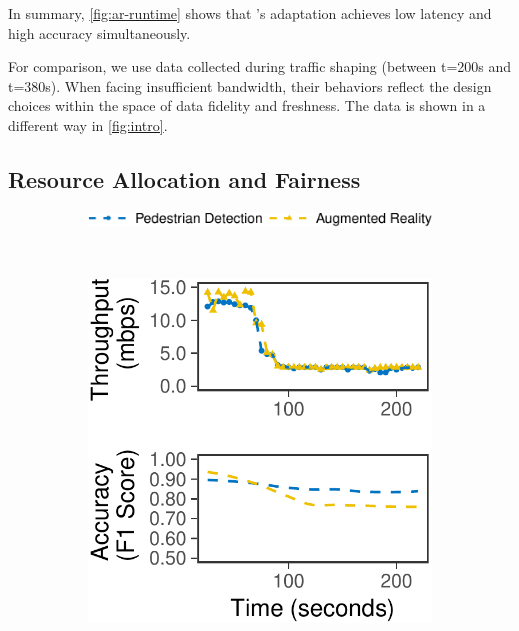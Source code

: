 In summary, \autoref{fig:ar-runtime} shows that \sysname{}'s adaptation achieves
low latency and high accuracy simultaneously.

 For comparison, we use data collected during traffic
shaping (between t=200s and t=380s). When facing insufficient bandwidth, their
behaviors reflect the design choices within the space of data fidelity and
freshness.  The data is shown in a different way in \autoref{fig:intro}.



\subsection{Resource Allocation and Fairness}
\label{sec:multi-task-alloc}

\begin{figure}
  \centering
  \begin{subfigure}[t]{0.8\columnwidth}
    \centering
    \includegraphics[width=\textwidth]{figures/multitask-legend.pdf}
  \end{subfigure}
  \\
  \vspace{1em}
  \begin{subfigure}[t]{0.45\columnwidth}
    \centering
    \includegraphics[width=\textwidth]{figures/multitask-left.pdf}

\end{subfigure}
\end{figure}
